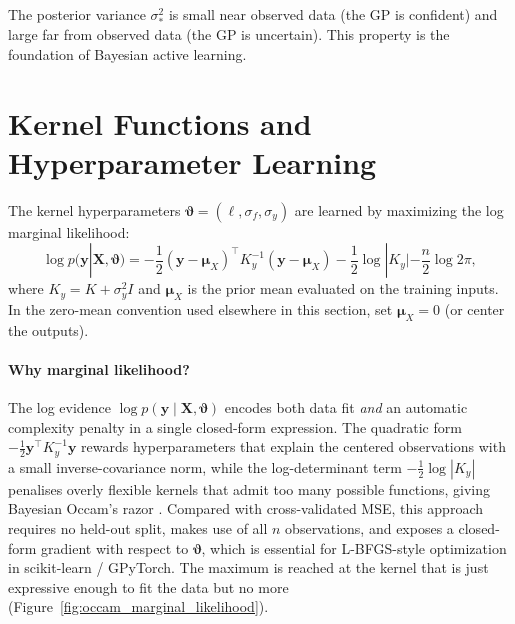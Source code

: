 \documentclass[11pt,a4paper]{report}
\newcommand{\X}{\bm{X}}
\begin{document}
\begin{keyinsightbox}
The posterior variance $\sigma_*^2$ is small near observed data (the GP is confident) and large far from observed data (the GP is uncertain).  This property is the foundation of Bayesian active learning.
\end{keyinsightbox}

\section{Kernel Functions and Hyperparameter Learning}
\label{sec:gp_kernels}

The kernel hyperparameters $\bm{\vartheta} = (\ell, \sigma_f, \sigma_y)$ are learned by maximizing the log marginal likelihood:
\begin{equation}
\log p(\bm{y} | \X, \bm{\vartheta}) = -\frac{1}{2}(\bm{y}-\bm{\mu}_X)^\top K_y^{-1}(\bm{y}-\bm{\mu}_X) - \frac{1}{2}\log|K_y| - \frac{n}{2}\log 2\pi,
\end{equation}
where $K_y = K + \sigma_y^2 I$ and $\bm{\mu}_X$ is the prior mean evaluated on the training inputs.  In the zero-mean convention used elsewhere in this section, set $\bm{\mu}_X = 0$ (or center the outputs).

\paragraph{Why marginal likelihood?}  The log evidence $\log p(\bm y \mid \X, \bm\vartheta)$ encodes both data fit \emph{and} an automatic complexity penalty in a single closed-form expression.  The quadratic form $-\tfrac{1}{2}\bm y^\top K_y^{-1}\bm y$ rewards hyperparameters that explain the centered observations with a small inverse-covariance norm, while the log-determinant term $-\tfrac{1}{2}\log|K_y|$ penalises overly flexible kernels that admit too many possible functions, giving Bayesian Occam's razor \citep[see, e.g.,][Ch.~5]{Rasmussen:2005:GPM:1162254}.  Compared with cross-validated MSE, this approach requires no held-out split, makes use of all $n$ observations, and exposes a closed-form gradient with respect to $\bm\vartheta$, which is essential for L-BFGS-style optimization in scikit-learn / GPyTorch.  The maximum is reached at the kernel that is just expressive enough to fit the data but no more (Figure~\ref{fig:occam_marginal_likelihood}).
\end{document}
